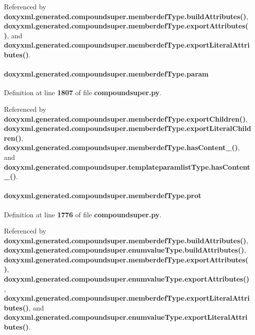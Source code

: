 Referenced by {\bf doxyxml.\+generated.\+compoundsuper.\+memberdef\+Type.\+build\+Attributes()}, {\bf doxyxml.\+generated.\+compoundsuper.\+memberdef\+Type.\+export\+Attributes()}, and {\bf doxyxml.\+generated.\+compoundsuper.\+memberdef\+Type.\+export\+Literal\+Attributes()}.

\paragraph[{param}]{\setlength{\rightskip}{0pt plus 5cm}doxyxml.\+generated.\+compoundsuper.\+memberdef\+Type.\+param}\label{classdoxyxml_1_1generated_1_1compoundsuper_1_1memberdefType_ad63137acf76571f2d8016386df01a391}


Definition at line {\bf 1807} of file {\bf compoundsuper.\+py}.



Referenced by {\bf doxyxml.\+generated.\+compoundsuper.\+memberdef\+Type.\+export\+Children()}, {\bf doxyxml.\+generated.\+compoundsuper.\+memberdef\+Type.\+export\+Literal\+Children()}, {\bf doxyxml.\+generated.\+compoundsuper.\+memberdef\+Type.\+has\+Content\+\_\+()}, and {\bf doxyxml.\+generated.\+compoundsuper.\+templateparamlist\+Type.\+has\+Content\+\_\+()}.

\paragraph[{prot}]{\setlength{\rightskip}{0pt plus 5cm}doxyxml.\+generated.\+compoundsuper.\+memberdef\+Type.\+prot}\label{classdoxyxml_1_1generated_1_1compoundsuper_1_1memberdefType_a8e15ee5c9eeab010d048b38776551398}


Definition at line {\bf 1776} of file {\bf compoundsuper.\+py}.



Referenced by {\bf doxyxml.\+generated.\+compoundsuper.\+memberdef\+Type.\+build\+Attributes()}, {\bf doxyxml.\+generated.\+compoundsuper.\+enumvalue\+Type.\+build\+Attributes()}, {\bf doxyxml.\+generated.\+compoundsuper.\+memberdef\+Type.\+export\+Attributes()}, {\bf doxyxml.\+generated.\+compoundsuper.\+enumvalue\+Type.\+export\+Attributes()}, {\bf doxyxml.\+generated.\+compoundsuper.\+memberdef\+Type.\+export\+Literal\+Attributes()}, and {\bf doxyxml.\+generated.\+compoundsuper.\+enumvalue\+Type.\+export\+Literal\+Attributes()}.

